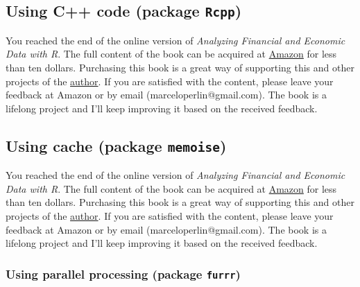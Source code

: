 \documentclass[
  12pt,
]{book}
\newenvironment{pleasebuyit}
{\begin{noteblock}
		
	} {\end{noteblock}}
\begin{document}
\hypertarget{using-c-code-package-rcpp}{%
\subsection{\texorpdfstring{Using C++ code (package \texttt{Rcpp})}{Using C++ code (package Rcpp)}}\label{using-c-code-package-rcpp}}

\begin{pleasebuyit}
You reached the end of the online version of \emph{Analyzing Financial
and Economic Data with R}. The full content of the book can be acquired
at \href{https://www.amazon.com/dp/B084LSNXMN}{Amazon} for less than ten
dollars. Purchasing this book is a great way of supporting this and
other projects of the \href{https://www.msperlin.com/}{author}. If you
are satisfied with the content, please leave your feedback at Amazon or
by email (marceloperlin@gmail.com). The book is a lifelong project and
I'll keep improving it based on the received feedback.
\end{pleasebuyit}

\hypertarget{using-cache-package-memoise}{%
\subsection{\texorpdfstring{Using cache (package \texttt{memoise})}{Using cache (package memoise)}}\label{using-cache-package-memoise}}

\begin{pleasebuyit}
You reached the end of the online version of \emph{Analyzing Financial
and Economic Data with R}. The full content of the book can be acquired
at \href{https://www.amazon.com/dp/B084LSNXMN}{Amazon} for less than ten
dollars. Purchasing this book is a great way of supporting this and
other projects of the \href{https://www.msperlin.com/}{author}. If you
are satisfied with the content, please leave your feedback at Amazon or
by email (marceloperlin@gmail.com). The book is a lifelong project and
I'll keep improving it based on the received feedback.
\end{pleasebuyit}

\hypertarget{using-parallel-processing-package-furrr}{%
\subsubsection{\texorpdfstring{Using parallel processing (package \texttt{furrr})}{Using parallel processing (package furrr)}}\label{using-parallel-processing-package-furrr}}
\end{document}
